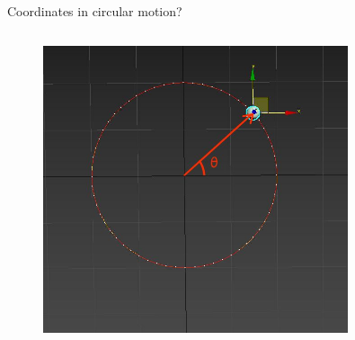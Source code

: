 \documentclass[]{beamer}
\begin{document}
\begin{frame}

    Coordinates in circular motion?
    
 
        
   
 
           \begin{columns}[c]
             \column{2.3in}  %
  
           
 
             \column{2.5in}
             
       
             \begin{figure}[h!]  
                 \includegraphics[width=0.8\textwidth]{images/31.jpg}
             
               \end{figure}
               
               
               
                
          
             \end{columns}
 
 
 
      
        \end{frame}
\end{document}
